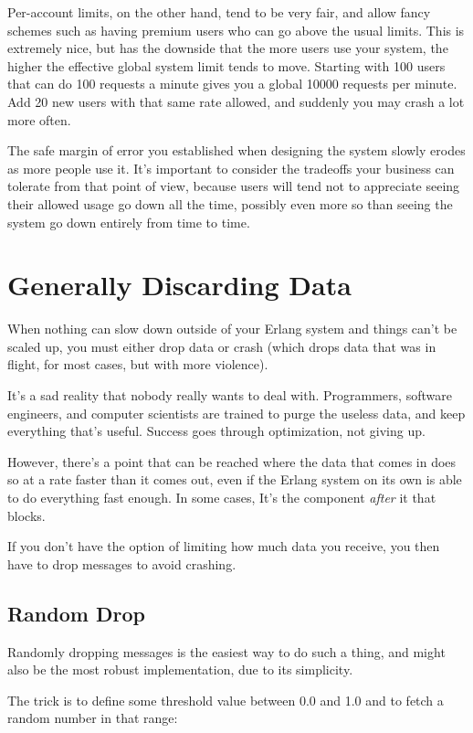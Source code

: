 \documentclass[11pt, oneside]{book}   	%
\begin{document}
Per-account limits, on the other hand, tend to be very fair, and allow fancy schemes such as having premium users who can go above the usual limits. This is extremely nice, but has the downside that the more users use your system, the higher the effective global system limit tends to move. Starting with 100 users that can do 100 requests a minute gives you a global 10000 requests per minute. Add 20 new users with that same rate allowed, and suddenly you may crash a lot more often.

The safe margin of error you established when designing the system slowly erodes as more people use it. It's important to consider the tradeoffs your business can tolerate from that point of view, because users will tend not to appreciate seeing their allowed usage go down all the time, possibly even more so than seeing the system go down entirely from time to time.


\section{Generally Discarding Data}

When nothing can slow down outside of your Erlang system and things can't be scaled up, you must either drop data or crash (which drops data that was in flight, for most cases, but with more violence).

It's a sad reality that nobody really wants to deal with. Programmers, software engineers, and computer scientists are trained to purge the useless data, and keep everything that's useful. Success goes through optimization, not giving up.

However, there's a point that can be reached where the data that comes in does so at a rate faster than it comes out, even if the Erlang system on its own is able to do everything fast enough. In some cases, It's the component \emph{after} it that blocks.

If you don't have the option of limiting how much data you receive, you then have to drop messages to avoid crashing.

\subsection{Random Drop}

Randomly dropping messages is the easiest way to do such a thing, and might also be the most robust implementation, due to its simplicity.

The trick is to define some threshold value between 0.0 and 1.0 and to fetch a random number in that range:
\end{document}
